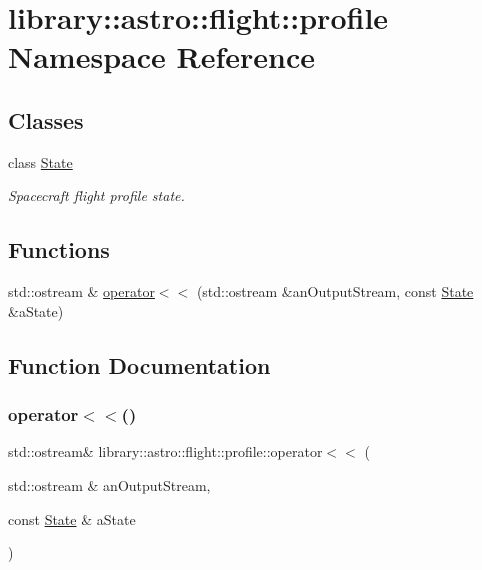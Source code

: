\hypertarget{namespacelibrary_1_1astro_1_1flight_1_1profile}{}\section{library\+:\+:astro\+:\+:flight\+:\+:profile Namespace Reference}
\label{namespacelibrary_1_1astro_1_1flight_1_1profile}
\subsection*{Classes}
\begin{DoxyCompactItemize}
\item 
class \hyperlink{classlibrary_1_1astro_1_1flight_1_1profile_1_1_state}{State}
\begin{DoxyCompactList}\small\item\em Spacecraft flight profile state. \end{DoxyCompactList}\end{DoxyCompactItemize}
\subsection*{Functions}
\begin{DoxyCompactItemize}
\item 
std\+::ostream \& \hyperlink{namespacelibrary_1_1astro_1_1flight_1_1profile_a132bb930953f08581e488cf79708cf21}{operator$<$$<$} (std\+::ostream \&an\+Output\+Stream, const \hyperlink{classlibrary_1_1astro_1_1flight_1_1profile_1_1_state}{State} \&a\+State)
\end{DoxyCompactItemize}


\subsection{Function Documentation}
\mbox{\label{namespacelibrary_1_1astro_1_1flight_1_1profile_a132bb930953f08581e488cf79708cf21}} 
\subsubsection{\texorpdfstring{operator$<$$<$()}{operator<<()}}
{\footnotesize\ttfamily std\+::ostream\& library\+::astro\+::flight\+::profile\+::operator$<$$<$ (\begin{DoxyParamCaption}\item[{std\+::ostream \&}]{an\+Output\+Stream,  }\item[{const \hyperlink{classlibrary_1_1astro_1_1flight_1_1profile_1_1_state}{State} \&}]{a\+State }\end{DoxyParamCaption})}

